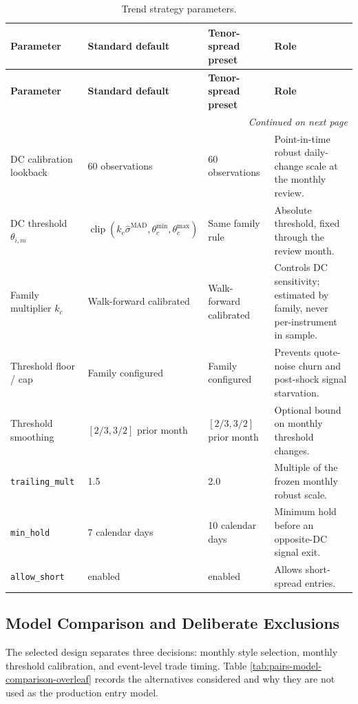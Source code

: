 {\small
\setlength{\LTleft}{0pt}
\setlength{\LTright}{0pt}
\setlength{\tabcolsep}{5pt}
\renewcommand{\arraystretch}{1.15}
\begin{longtable}{p{} p{} p{} p{}}
\caption{Trend strategy parameters.}\label{tab:pairs-trend-defaults-overleaf} \\
\toprule
\textbf{Parameter} & \textbf{Standard default} & \textbf{Tenor-spread preset} & \textbf{Role} \\
\midrule
\endfirsthead
\toprule
\textbf{Parameter} & \textbf{Standard default} & \textbf{Tenor-spread preset} & \textbf{Role} \\
\midrule
\endhead
\midrule
\multicolumn{4}{r}{\textit{Continued on next page}} \\
\midrule
\endfoot
\bottomrule
\endlastfoot
DC calibration lookback & 60 observations & 60 observations & Point-in-time robust daily-change scale at the monthly review. \\
DC threshold $\theta_{i,m}$ & $\operatorname{clip}(k_c\hat{\sigma}^{\mathrm{MAD}},\theta_c^{\min},\theta_c^{\max})$ & Same family rule & Absolute threshold, fixed through the review month. \\
Family multiplier $k_c$ & Walk-forward calibrated & Walk-forward calibrated & Controls DC sensitivity; estimated by family, never per-instrument in sample. \\
Threshold floor / cap & Family configured & Family configured & Prevents quote-noise churn and post-shock signal starvation. \\
Threshold smoothing & $[2/3,3/2]$ prior month & $[2/3,3/2]$ prior month & Optional bound on monthly threshold changes. \\
\texttt{trailing\_mult} & 1.5 & 2.0 & Multiple of the frozen monthly robust scale. \\
\texttt{min\_hold} & 7 calendar days & 10 calendar days & Minimum hold before an opposite-DC signal exit. \\
\texttt{allow\_short} & enabled & enabled & Allows short-spread entries. \\
\end{longtable}
}

\subsection{Model Comparison and Deliberate Exclusions}

The selected design separates three decisions: monthly style selection, monthly
threshold calibration, and event-level trade timing. Table
\ref{tab:pairs-model-comparison-overleaf} records the alternatives considered and
why they are not used as the production entry model.

